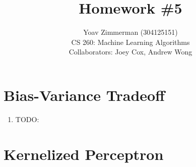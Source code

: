 \documentclass[12pt]{article}
\begin{document}
\title{Homework \#5}
\author{Yoav Zimmerman (304125151) \\
	    CS 260: Machine Learning Algorithms \\
	   Collaborators: Joey Cox, Andrew Wong}
\maketitle

\section{Bias-Variance Tradeoff}
\begin{enumerate}[label=\alph*.]
	\item TODO:
\end{enumerate}

\section{Kernelized Perceptron}
\end{document}
